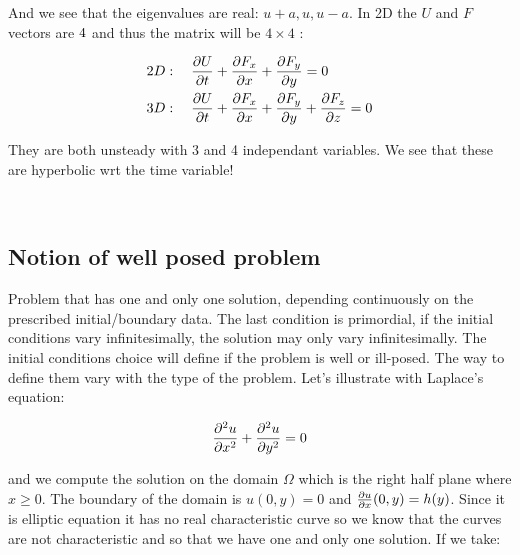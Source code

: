 {And we see that the eigenvalues are real: $u+a, u , u-a$. In 2D the $U$ and $F$ vectors are $4\time 1$ and thus the matrix will be $4\times 4$ : 

\begin{equation}
\begin{aligned}
&2D: \quad \frac{\partial U}{\partial t} + \frac{\partial F_x}{\partial x}+ \frac{\partial F_y}{\partial y}  = 0\\
&3D: \quad \frac{\partial U}{\partial t} + \frac{\partial F_x}{\partial x}+ \frac{\partial F_y}{\partial y} + \frac{\partial F_z}{\partial z}  = 0
\end{aligned}
\end{equation}

They are both unsteady with 3 and 4 independant variables. We see that these are hyperbolic wrt the time variable!} 

\ \\


\subsection{Notion of well posed problem}
Problem that has one and only one solution, depending continuously on the prescribed initial/boundary data. The last condition is primordial, if the initial conditions vary infinitesimally, the solution may only vary infinitesimally.  The initial conditions choice will define if the problem is well or ill-posed. The way to define them vary with the type of the problem. Let's illustrate with Laplace's equation: 

\begin{equation}
\frac{\partial ^2 u}{\partial x^2} + \frac{\partial ^2 u}{\partial y^2} = 0
\end{equation}

and we compute the solution on the domain $\Omega$ which is the right half plane where $x\geq 0$. The boundary of the domain is $u(0,y) = 0$ and $\frac{\partial u}{\partial x}(0,y) = h(y)$. Since it is elliptic equation it has no real characteristic curve so we know that the curves are not characteristic and so that we have one and only one solution. If we take: 

